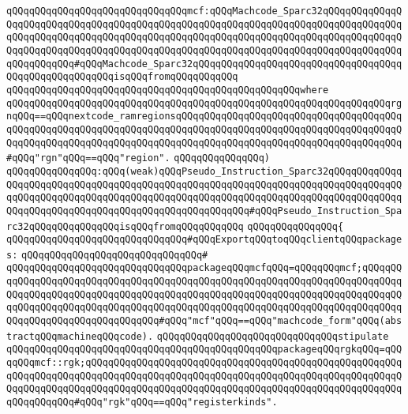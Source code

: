 \verb|qQQqqQQqqQQqqQQqqQQqqQQqqQQqqQQqmcf:qQQqMachcode_Sparc32qQQqqQQqqQQqqQQqqQQqqQQqqQQqqQQqqQQqqQQqqQQqqQQqqQQqqQQqqQQqqQQqqQQqqQQqqQQqqQQqqQQqqQQqqQQqqQQqqQQqqQQqqQQqqQQqqQQqqQQqqQQqqQQqqQQqqQQqqQQqqQQqqQQqqQQqqQQqqQQqqQQqqQQqqQQqqQQqqQQqqQQqqQQqqQQqqQQqqQQqqQQqqQQqqQQqqQQqqQQqqQQqqQQqqQQqqQQq#qQQqMachcode_Sparc32qQQqqQQqqQQqqQQqqQQqqQQqqQQqqQQqqQQqqQQqqQQqqQQqqQQqqQQqisqQQqfromqQQqqQQqqQQq|\newline
\verb|qQQqqQQqqQQqqQQqqQQqqQQqqQQqqQQqqQQqqQQqqQQqqQQqqQQqwhere|\newline
\verb|qQQqqQQqqQQqqQQqqQQqqQQqqQQqqQQqqQQqqQQqqQQqqQQqqQQqqQQqqQQqqQQqqQQqrgnqQQq==qQQqnextcode_ramregionsqQQqqQQqqQQqqQQqqQQqqQQqqQQqqQQqqQQqqQQqqQQqqQQqqQQqqQQqqQQqqQQqqQQqqQQqqQQqqQQqqQQqqQQqqQQqqQQqqQQqqQQqqQQqqQQqqQQqqQQqqQQqqQQqqQQqqQQqqQQqqQQqqQQqqQQqqQQqqQQqqQQqqQQqqQQqqQQqqQQq#qQQq"rgn"qQQq==qQQq"region".|\newline
\verb|qQQqqQQqqQQqqQQq)|\newline
\verb|qQQqqQQqqQQqqQQq:qQQq(weak)qQQqPseudo_Instruction_Sparc32qQQqqQQqqQQqqQQqqQQqqQQqqQQqqQQqqQQqqQQqqQQqqQQqqQQqqQQqqQQqqQQqqQQqqQQqqQQqqQQqqQQqqQQqqQQqqQQqqQQqqQQqqQQqqQQqqQQqqQQqqQQqqQQqqQQqqQQqqQQqqQQqqQQqqQQqqQQqqQQqqQQqqQQqqQQqqQQqqQQqqQQqqQQqqQQqqQQq#qQQqPseudo_Instruction_Sparc32qQQqqQQqqQQqqQQqisqQQqfromqQQqqQQqqQQq|\newline
\verb|qQQqqQQqqQQqqQQq{|\newline
\verb|qQQqqQQqqQQqqQQqqQQqqQQqqQQqqQQq#qQQqExportqQQqtoqQQqclientqQQqpackages:|\newline
\verb|qQQqqQQqqQQqqQQqqQQqqQQqqQQqqQQq#|\newline
\verb|qQQqqQQqqQQqqQQqqQQqqQQqqQQqqQQqpackageqQQqmcfqQQq=qQQqqQQqmcf;qQQqqQQqqQQqqQQqqQQqqQQqqQQqqQQqqQQqqQQqqQQqqQQqqQQqqQQqqQQqqQQqqQQqqQQqqQQqqQQqqQQqqQQqqQQqqQQqqQQqqQQqqQQqqQQqqQQqqQQqqQQqqQQqqQQqqQQqqQQqqQQqqQQqqQQqqQQqqQQqqQQqqQQqqQQqqQQqqQQqqQQqqQQqqQQqqQQqqQQqqQQqqQQqqQQqqQQqqQQqqQQqqQQqqQQqqQQqqQQqqQQq#qQQq"mcf"qQQq==qQQq"machcode_form"qQQq(abstractqQQqmachineqQQqcode).|\newline
\newline
\verb|qQQqqQQqqQQqqQQqqQQqqQQqqQQqqQQqstipulate|\newline
\verb|qQQqqQQqqQQqqQQqqQQqqQQqqQQqqQQqqQQqqQQqqQQqqQQqpackageqQQqrgkqQQq=qQQqqQQqmcf::rgk;qQQqqQQqqQQqqQQqqQQqqQQqqQQqqQQqqQQqqQQqqQQqqQQqqQQqqQQqqQQqqQQqqQQqqQQqqQQqqQQqqQQqqQQqqQQqqQQqqQQqqQQqqQQqqQQqqQQqqQQqqQQqqQQqqQQqqQQqqQQqqQQqqQQqqQQqqQQqqQQqqQQqqQQqqQQqqQQqqQQqqQQqqQQqqQQqqQQqqQQqqQQqqQQq#qQQq"rgk"qQQq==qQQq"registerkinds".|\newline
